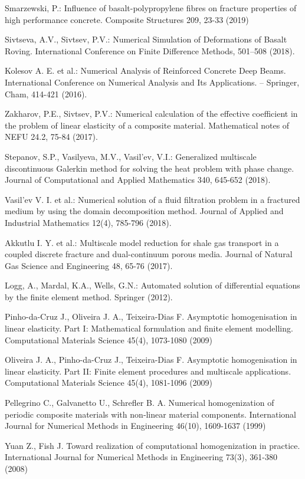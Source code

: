 \documentclass[a4paper]{jpconf}
\begin{document}
\begin{thebibliography}{}

Smarzewski, P.:
Influence of basalt-polypropylene fibres on fracture properties of high performance concrete.
Composite Structures 209, 23-33 (2019)

Sivtseva, A.V.,  Sivtsev, P.V.:
Numerical Simulation of Deformations of Basalt Roving.
International Conference on Finite Difference Methods, 501--508 (2018).

Kolesov A. E. et al.:
Numerical Analysis of Reinforced Concrete Deep Beams.
International Conference on Numerical Analysis and Its Applications. – Springer, Cham, 414-421 (2016).

Zakharov, P.E., Sivtsev, P.V.:
Numerical calculation of the effective coefficient in the problem of linear elasticity of a composite material. 
Mathematical notes of NEFU 24.2, 75-84 (2017).

Stepanov, S.P., Vasilyeva, M.V., Vasil’ev, V.I.:
Generalized multiscale discontinuous Galerkin method for solving the heat problem with phase change.
Journal of Computational and Applied Mathematics 340, 645-652 (2018).

Vasil’ev V. I. et al.: 
Numerical solution of a fluid filtration problem in a fractured medium by using the domain decomposition method. 
Journal of Applied and Industrial Mathematics 12(4), 785-796 (2018).

Akkutlu I. Y. et al.: 
Multiscale model reduction for shale gas transport in a coupled discrete fracture and dual-continuum porous media. 
Journal of Natural Gas Science and Engineering 48, 65-76 (2017).

Logg, A., Mardal, K.A., Wells, G.N.:
Automated solution of differential equations by the finite element method.
Springer (2012).

Pinho-da-Cruz J., Oliveira J. A., Teixeira-Dias F. Asymptotic homogenisation in linear elasticity. Part I: Mathematical formulation and finite element modelling. Computational Materials Science 45(4), 1073-1080 (2009)

Oliveira J. A., Pinho-da-Cruz J., Teixeira-Dias F. Asymptotic homogenisation in linear elasticity. Part II: Finite element procedures and multiscale applications. Computational Materials Science 45(4), 1081-1096 (2009)

Pellegrino C., Galvanetto U., Schrefler B. A. Numerical homogenization of periodic composite materials with non‐linear material components. International Journal for Numerical Methods in Engineering 46(10), 1609-1637 (1999)
    
Yuan Z., Fish J. Toward realization of computational homogenization in practice. International Journal for Numerical Methods in Engineering 73(3), 361-380 (2008)


\end{thebibliography}
\end{document}
